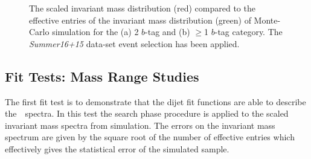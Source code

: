 \begin{figure}[!ht]
  \begin{center}
    \captionsetup[subfigure]{aboveskip=0pt,justification=centering}
  \end{center}
  \caption{The scaled invariant mass distribution (red) compared to the
    effective entries of the invariant mass distribution (green)
    of Monte-Carlo simulation for the (a) 2 $b$-tag and (b) $\geq$1 $b$-tag category.
    The \textit{Summer16+15} data-set event selection has been applied.}
  \label{fig:effEnt}
\end{figure}

\subsection{Fit Tests: Mass Range Studies}
\label{sec:bkg-summer_range}

The first fit test is to demonstrate that the dijet fit functions are able to describe the~\mjj~spectra.
In this test the search phase procedure is applied to the scaled invariant mass spectra from simulation.
The errors on the invariant mass spectrum are given by the square root of the number of effective entries
which effectively gives the statistical error of the simulated sample.

